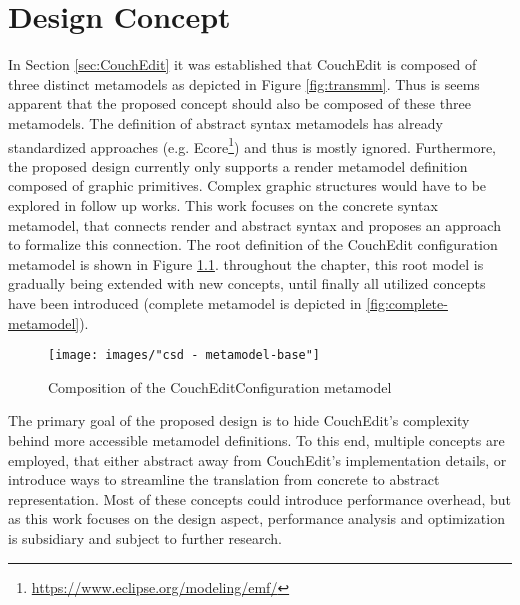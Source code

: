 \chapter{Design Concept}
\label{chap:design}
In Section \ref{sec:CouchEdit} it was established that CouchEdit is composed of three distinct metamodels as depicted in Figure \ref{fig:transmm}. Thus is seems apparent that the proposed concept should also be composed of these three metamodels. The definition of abstract syntax metamodels has already standardized approaches (e.g. Ecore\footnote{\url{https://www.eclipse.org/modeling/emf/}}) and thus is mostly ignored. Furthermore, the proposed design currently only supports a render metamodel definition composed of graphic primitives. Complex graphic structures would have to be explored in follow up works. This work focuses on the concrete syntax metamodel, that connects render and abstract syntax and proposes an approach to formalize this connection. The root definition of the CouchEdit configuration metamodel is shown in Figure \ref{fig:metamodel-base}. throughout the chapter, this root model is gradually being extended with new concepts, until finally all utilized concepts have been introduced (complete metamodel is depicted in \ref{fig:complete-metamodel}).

\begin{figure}
  \centering
  \texttt{[image: images/"csd - metamodel-base"]}
  \caption{Composition of the CouchEditConfiguration metamodel}
  \label{fig:metamodel-base}
\end{figure}

The primary goal of the proposed design is to hide CouchEdit's complexity behind more accessible metamodel definitions. To this end, multiple concepts are employed, that either abstract away from CouchEdit's implementation details, or introduce ways to streamline the translation from concrete to abstract representation. Most of these concepts could introduce performance overhead, but as this work focuses on the design aspect, performance analysis and optimization is subsidiary and subject to further research.

